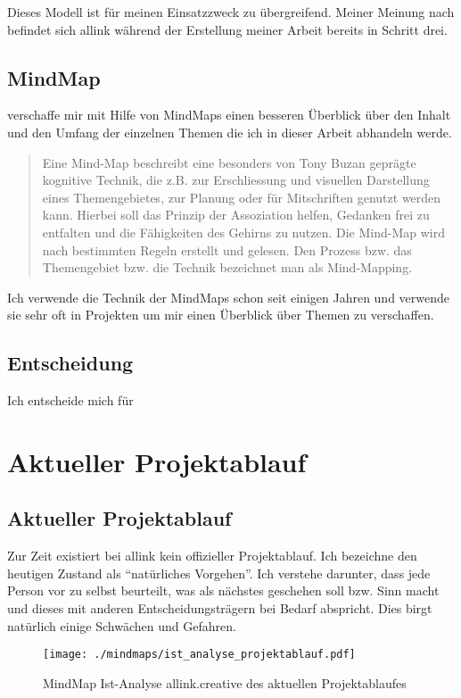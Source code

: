 Dieses Modell ist für meinen Einsatzzweck zu übergreifend. Meiner Meinung nach
befindet sich allink während der Erstellung meiner Arbeit bereits in Schritt drei.

\subsection{MindMap}
verschaffe mir mit Hilfe von MindMaps einen besseren Überblick über
den Inhalt und den Umfang der einzelnen Themen die ich in dieser Arbeit 
abhandeln werde.

\begin{quotation}
Eine Mind-Map beschreibt eine besonders von Tony Buzan geprägte kognitive 
Technik, die z.B. zur Erschliessung und visuellen Darstellung eines Themengebietes, 
zur Planung oder für Mitschriften genutzt werden kann. Hierbei soll das Prinzip 
der Assoziation helfen, Gedanken frei zu entfalten und die Fähigkeiten des Gehirns 
zu nutzen. Die Mind-Map wird nach bestimmten Regeln erstellt und gelesen. Den 
Prozess bzw. das Themengebiet bzw. die Technik bezeichnet man als Mind-Mapping.
\cite{wikipedia_mindmap}
\end{quotation}

Ich verwende die Technik der MindMaps schon seit einigen Jahren und verwende
sie sehr oft in Projekten um mir einen Überblick über Themen zu verschaffen.

\subsection{Entscheidung}
Ich entscheide mich für

\section{Aktueller Projektablauf}

\subsection{Aktueller Projektablauf}
Zur Zeit existiert bei allink kein offizieller Projektablauf. Ich bezeichne
den heutigen Zustand als ``natürliches Vorgehen''. Ich verstehe darunter,
dass jede Person vor zu selbst beurteilt, was als nächstes geschehen soll bzw.
Sinn macht und dieses mit anderen Entscheidungsträgern bei Bedarf abspricht.
Dies birgt natürlich einige Schwächen und Gefahren.

\begin{figure}[htbp]
\begin{center}
\texttt{[image: ./mindmaps/ist\_analyse\_projektablauf.pdf]}
\caption{MindMap Ist-Analyse allink.creative des aktuellen Projektablaufes}
\label{pic:ist_analyse_projektablauf}
\end{center}
\end{figure}

